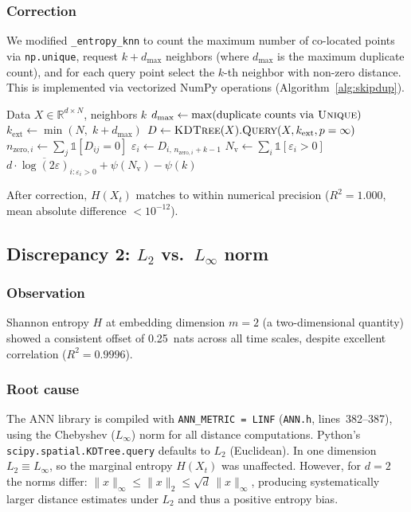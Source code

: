 \documentclass[12pt,a4paper]{article}
\begin{document}
\subsubsection{Correction}
We modified \texttt{\_entropy\_knn} to count the maximum number of co-located points via \texttt{np.unique}, request $k + d_{\max}$ neighbors (where $d_{\max}$ is the maximum duplicate count), and for each query point select the $k$-th neighbor with non-zero distance.
This is implemented via vectorized NumPy operations (Algorithm~\ref{alg:skipdup}).

\begin{algorithm}[t]
\caption{Zero-distance--aware k-NN entropy estimation}\label{alg:skipdup}
\begin{algorithmic}[1]
\Require Data $X \in \mathbb{R}^{d \times N}$, neighbors $k$
\State $d_{\max} \gets \max(\text{duplicate counts via \textsc{Unique}})$
\State $k_{\mathrm{ext}} \gets \min(N,\; k + d_{\max})$
\State $D \gets \textsc{KDTree}(X).\textsc{Query}(X, k_{\mathrm{ext}}, p = \infty)$ 
\State $n_{\mathrm{zero},i} \gets \sum_{j} \mathbb{1}[D_{ij} = 0]$ 
\State $\varepsilon_i \gets D_{i,\, n_{\mathrm{zero},i} + k - 1}$ 
\State $N_{\mathrm{v}} \gets \sum_i \mathbb{1}[\varepsilon_i > 0]$
\State \Return $d \cdot \overline{\log(2\varepsilon)}_{i:\varepsilon_i > 0} + \psi(N_{\mathrm{v}}) - \psi(k)$
\end{algorithmic}
\end{algorithm}

After correction, $H(X_t)$ matches to within numerical precision ($R^2 = 1.000$, mean absolute difference $< 10^{-12}$).


\subsection{Discrepancy 2: $L_2$ vs.\ $L_\infty$ norm}\label{sec:bug2}

\subsubsection{Observation}
Shannon entropy $H$ at embedding dimension $m = 2$ (a two-dimensional quantity) showed a consistent offset of \SI{0.25}{nats} across all time scales, despite excellent correlation ($R^2 = 0.9996$).

\subsubsection{Root cause}
The ANN library is compiled with \texttt{ANN\_METRIC = LINF} (\texttt{ANN.h}, lines~382--387), using the Chebyshev ($L_\infty$) norm for all distance computations.
Python's \texttt{scipy.spatial.KDTree.query} defaults to $L_2$ (Euclidean).
In one dimension $L_2 \equiv L_\infty$, so the marginal entropy $H(X_t)$ was unaffected.
However, for $d = 2$ the norms differ: $\|x\|_\infty \leq \|x\|_2 \leq \sqrt{d}\,\|x\|_\infty$, producing systematically larger distance estimates under $L_2$ and thus a positive entropy bias.
\end{document}
